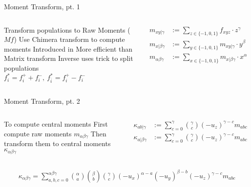 \begin{frame}{Moment Transform, pt. 1}
\begin{columns}
\begin{outline}
  \1 Transform populations to Raw Moments ($Mf$)
  \1 Use Chimera transform to compute moments    
  \2 Introduced in \cite{Geier2015}
  \1 More efficient than Matrix transform
  \1 Inverse uses trick to split populations \\
  $f^{*}_i = f^{+}_i + f^{-}_i, \ f^{*}_{\bar{i}} = f_i^{+} - f^{-}_i$
\end{outline}


\centering
\begin{center}
\begin{align*}
  m_{xy|\gamma} &:= \sum_{z \in \{-1, 0, 1\}} f_{xyz} \cdot z^{\gamma} \\ 
  m_{x|\beta\gamma} &:= \sum_{y \in \{-1, 0, 1\}} m_{xy|\gamma} \cdot y^{\beta} \\ 
  m_{\alpha\beta\gamma} &:= \sum_{x \in \{-1, 0, 1\}} m_{x|\beta\gamma} \cdot x^{\alpha} \\ 
\end{align*}
\end{center}
\end{columns}
\end{frame}

\begin{frame}{Moment Transform, pt. 2}
\begin{columns}
\begin{outline}
  \1 To compute central moments
  \1 First compute raw moments $m_{\alpha\beta\gamma}$
  \1 Then transform them to central moments $\kappa_{\alpha\beta\gamma}$
\end{outline}


\centering
\begin{center}
\begin{align*}
  \kappa_{ab|\gamma} &:= 
  \sum_{c = 0}^{\gamma} \binom{\gamma}{c} (-u_z)^{\gamma - c} m_{a b c} \\
  \kappa_{a|\beta\gamma} &:= 
  \sum_{c = 0}^{\gamma} \binom{\gamma}{c} (-u_z)^{\gamma - c} m_{a b c} \\
\end{align*}
\end{center}
\end{columns}

  \begin{align*}
    \kappa_{\alpha\beta\gamma} = 
    \sum_{a, b, c = 0}^{\alpha\beta\gamma} 
    \binom{\alpha}{a} \binom{\beta}{b} \binom{\gamma}{c} 
    (-u_x)^{\alpha - a}(-u_y)^{\beta - b} (-u_z)^{\gamma - c} m_{a b c}
  \end{align*}


\end{frame}



